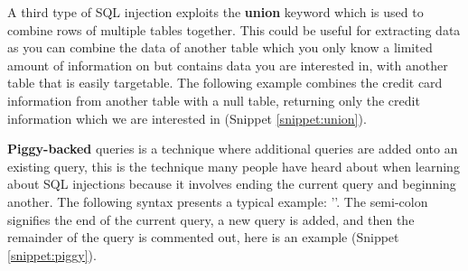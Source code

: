 \begin{codesnippet}
	\vspace{0.25in}
	\noindent
	\label{snippet:malformed}
	\vspace{0.25in}
\end{codesnippet}

A third type of SQL injection exploits the \textbf{union} keyword which is used to combine rows of multiple tables together.  This could be useful for extracting data as you can combine the data of another table which you only know a limited amount of information on but contains data you are interested in, with another table that is easily targetable.  The following example combines the credit card information from another table with a null table, returning only the credit information which we are interested in (Snippet \ref{snippet:union}).

\begin{codesnippet}
	\vspace{0.25in}
	\noindent
	\label{snippet:union}
	\vspace{0.25in}
\end{codesnippet}

\textbf{Piggy-backed} queries is a technique where additional queries are added onto an existing query, this is the technique many people have heard about when learning about SQL injections because it involves ending the current query and beginning another.  The following syntax presents a typical example: ''.  The semi-colon signifies the end of the current query, a new query is added, and then the remainder of the query is commented out, here is an example (Snippet \ref{snippet:piggy}).

\begin{codesnippet}
	\vspace{0.25in}
	\noindent
	\label{snippet:piggy}
	\vspace{0.25in}
\end{codesnippet}

